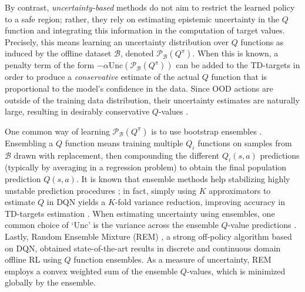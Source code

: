 By contrast, \textit{uncertainty-based} methods do not aim to
restrict the learned policy to a safe region; rather, they rely on
estimating epistemic uncertainty in the $Q$ function and integrating
this information in the computation of target values. Precisely, this
means learning an uncertainty distribution over $Q$ functions as
induced by the offline dataset $\mathcal{B}$, denoted
$\mathcal{P}_{\mathcal{B}}\left(Q^\pi\right)$. When this is known, a
penalty term of the form
$-\alpha\textrm{Unc}\left(\mathcal{P}_{\mathcal{B}}\left(Q^\pi\right)\right)$
can be added to the TD-targets in order to produce a
\textit{conservative} estimate of the actual $Q$
function that is proportional to the model's confidence in the data.
Since OOD actions are outside of the training data distribution, their
uncertainty estimates are naturally large, resulting in desirably
conservative $Q$-values \citep{levine2020offline}.

One common way of learning $\mathcal{P}_{\mathcal{B}}\left(Q^\pi\right)$ is to
use bootstrap ensembles
\citep{osband2016deep,kumar2019stabilizing,agarwal2020optimistic}. Ensembling
a $Q$ function means training multiple $Q_i$ functions on samples from
$\mathcal{B}$ drawn with replacement, then compounding the different
$Q_i\left(s,a\right)$ predictions (typically by averaging in a
regression problem) to obtain the final population prediction
$Q\left(s,a\right)$. It is known that ensemble methods help
stabilizing highly unstable prediction procedures
\citep{breiman1996bagging}; in fact, simply using $K$ approximators to
estimate $Q$ in DQN yields a $K$-fold variance reduction, improving
accuracy in TD-targets estimation \citep{anschel2017averaged}. When
estimating uncertainty using ensembles, one common choice of `Unc' is
the variance across the ensemble $Q$-value predictions
\citep{kumar2019stabilizing}. Lastly, Random Ensemble Mixture (REM)
\citep{agarwal2020optimistic}, a strong off-policy algorithm based on
DQN, obtained state-of-the-art results in discrete and continuous
domain offline RL using $Q$ function ensembles. As a measure of
uncertainty, REM employs a convex weighted sum of the ensemble
$Q$-values, which is minimized globally by the ensemble.
